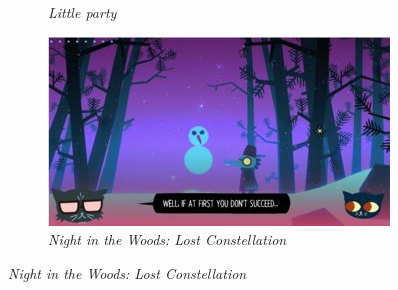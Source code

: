 \begin{figure}[H]
\begin{subfigure}{.5\textwidth}
    \caption{\textit{Little party}}
    \label{fig:artref4}
  \end{subfigure}
  \begin{subfigure}{.5\textwidth}
    \centering
    \includegraphics[width=.9\linewidth]{images/ref_nitw}
    \caption{\textit{Night in the Woods: Lost Constellation}}
    \label{fig:artref5}
  \end{subfigure}
  \label{fig:mstyle}
\end{figure}
